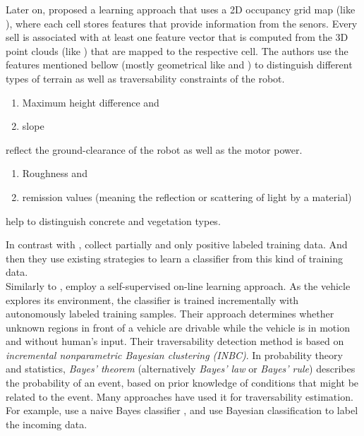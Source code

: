 \documentclass[12pt,a4paper,table,dvipsnames,tikz]{report}
\newcommand{\term}{\textit}
\newcommand{\acronym}{\MakeUppercase}
\begin{document}
	Later on, \citet{Suger} proposed a learning approach that uses a \acronym{2d} 
	occupancy grid map (like \citet{Shneier}), where each cell stores features that 
	provide information from the senors. Every sell is associated with at least one 
	feature vector that is computed from the \acronym{3d} point clouds (like 
	\citet{Lalonde}) that are mapped to the respective cell. The authors use the 
	features mentioned bellow (mostly geometrical like \citet{Lalonde} and 
	\citet{Pfaff}) to distinguish different types of terrain as well as 
	traversability constraints of the robot. 
	\begin{enumerate}
		\item Maximum height difference and
		\item slope 
	\end{enumerate}
	reflect the ground-clearance of the robot as well as the motor power.
	\begin{enumerate}
		\item Roughness and
		\item remission values (meaning the reflection or scattering 
		of light by a material) 
	\end{enumerate}
	help to distinguish concrete and vegetation types.
	\par
	In contrast with \citet{Kim}, \citet{Suger} collect partially and only positive labeled 
	training data. And then they use existing strategies \citep{Denis, Elkan} to 
	learn a classifier from this kind of training data.
	\\
	
	Similarly to \citet{Kim}, \citet{Lee} employ a self-supervised on-line learning 
	approach. As the vehicle explores its environment, the classifier is trained 
	incrementally with autonomously labeled training samples. Their approach 
	determines whether unknown regions in front of a vehicle are drivable while the 
	vehicle is in motion and without human’s input. Their traversability detection 
	method is based on \term{incremental nonparametric Bayesian clustering 
	(\acronym{inbc})}. In probability theory and statistics, \term{Bayes' theorem} 
	(alternatively \term{Bayes' law} or \term{Bayes' rule}) describes the probability 
	of an event, based on prior knowledge of conditions that might be related to the 
	event. Many approaches have used it for traversability estimation. For example, 
	\citet{Suger} use a naive Bayes classifier \citep{Denis}, and \citet{Lalonde} use 
	Bayesian classification to label the incoming data.
	\\
	
\end{document}
